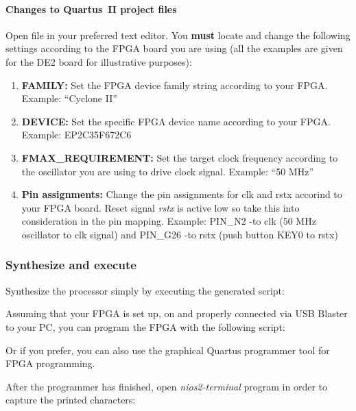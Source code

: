 \documentclass[twoside]{tceusermanual}
\begin{document}
\paragraph{Changes to Quartus~II project files}

Open file  in your preferred text
editor. You \textbf{must} locate and change the following settings
according to the FPGA board you are using (all the examples are given
for the DE2 board for illustrative purposes):

\begin{enumerate}
\item%
\textbf{FAMILY:} Set the FPGA device family string according to your
FPGA. Example: ``Cyclone II''

\item%
\textbf{DEVICE:} Set the specific FPGA device name according to your
FPGA. Example: EP2C35F672C6

\item%
\textbf{FMAX\_REQUIREMENT:} Set the target clock frequency according to
the oscillator you are using to drive clock signal. Example: ``50
MHz''

\item%
\textbf{Pin assignments:} Change the pin assignments for clk and rstx
accorind to your FPGA board. Reset signal \textit{rstx} is active low
so take this into consideration in the pin mapping. Example: PIN\_N2
-to clk (50 MHz oscillator to clk signal) and PIN\_G26 -to rstx (push
button KEY0 to rstx)
\end{enumerate}

\subsubsection{Synthesize and execute}

Synthesize the processor simply by executing the generated script:


Assuming that your FPGA is set up, on and properly connected via USB
Blaster to your PC, you can program the FPGA with the following script:


Or if you prefer, you can also use the graphical Quartus programmer
tool for FPGA programming.

After the programmer has finished, open \textit{nios2-terminal}
program in order to capture the printed characters:
\end{document}
